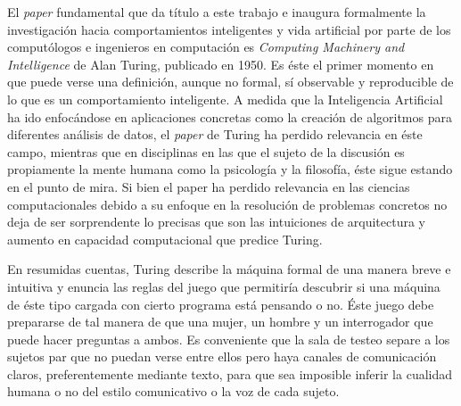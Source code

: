 \documentclass[12pt]{memoir}
\begin{document}
El \textit{paper} fundamental que da título a este trabajo e inaugura formalmente la investigación hacia comportamientos inteligentes y vida artificial por parte de los computólogos e ingenieros en computación es \textit{Computing Machinery and Intelligence} de Alan Turing, publicado en 1950. Es éste el primer momento en que puede verse una definición, aunque no formal, sí observable y reproducible de lo que es un comportamiento inteligente. A medida que la Inteligencia Artificial ha ido enfocándose en aplicaciones concretas como la creación de algoritmos para diferentes análisis de datos, el \textit{paper} de Turing ha perdido relevancia en éste campo, mientras que en disciplinas en las que el sujeto de la discusión es propiamente la mente humana como la psicología y la filosofía, éste sigue estando en el punto de mira. Si bien el paper ha perdido relevancia en las ciencias computacionales debido a su enfoque en la resolución de problemas concretos no deja de ser sorprendente lo precisas que son las intuiciones de arquitectura y aumento en capacidad computacional que predice Turing.

En resumidas cuentas, Turing describe la máquina formal de una manera breve e intuitiva y enuncia las reglas del juego que permitiría descubrir si una máquina de éste tipo cargada con cierto programa está pensando o no. Éste juego debe prepararse de tal manera de que una mujer, un hombre y un interrogador que puede hacer preguntas a ambos. Es conveniente que la sala de testeo separe a los sujetos par que no puedan verse entre ellos pero haya canales de comunicación claros, preferentemente mediante texto, para que sea imposible inferir la cualidad humana o no del estilo comunicativo o la voz de cada sujeto. 
\end{document}
